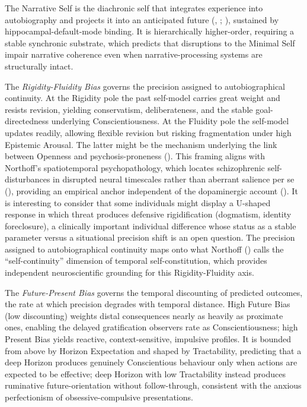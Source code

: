 \documentclass[
  jou,
  floatsintext,
  longtable,
  nolmodern,
  notxfonts,
  notimes,
  12pt,
  colorlinks=true,linkcolor=blue,citecolor=blue,urlcolor=blue]{apa7}
\begin{document}
The Narrative Self is the diachronic self that integrates experience
into autobiography and projects it into an anticipated future
(,
;
), sustained by
hippocampal-default-mode binding. It is hierarchically higher-order,
requiring a stable synchronic substrate, which predicts that disruptions
to the Minimal Self impair narrative coherence even when
narrative-processing systems are structurally intact.

The \emph{Rigidity-Fluidity Bias} governs the precision assigned to
autobiographical continuity. At the Rigidity pole the past self-model
carries great weight and resists revision, yielding conservatism,
deliberateness, and the stable goal-directedness underlying
Conscientiousness. At the Fluidity pole the self-model updates readily,
allowing flexible revision but risking fragmentation under high
Epistemic Arousal. The latter might be the mechanism underlying the link
between Openness and psychosis-proneness
(). This framing aligns
with Northoff's spatiotemporal psychopathology, which locates
schizophrenic self-disturbances in disrupted neural timescales rather
than aberrant salience per se
(), providing an
empirical anchor independent of the dopaminergic account
(). It is interesting to
consider that some individuals might display a U-shaped response in
which threat produces defensive rigidification (dogmatism, identity
foreclosure), a clinically important individual difference whose status
as a stable parameter versus a situational precision shift is an open
question. The precision assigned to autobiographical continuity maps
onto what Northoff () calls the
``self-continuity'' dimension of temporal self-constitution, which
provides independent neuroscientific grounding for this
Rigidity-Fluidity axis.

The \emph{Future-Present Bias} governs the temporal discounting of
predicted outcomes, the rate at which precision degrades with temporal
distance. High Future Bias (low discounting) weights distal consequences
nearly as heavily as proximate ones, enabling the delayed gratification
observers rate as Conscientiousness; high Present Bias yields reactive,
context-sensitive, impulsive profiles. It is bounded from above by
Horizon Expectation and shaped by Tractability, predicting that a deep
Horizon produces genuinely Conscientious behaviour only when actions are
expected to be effective; deep Horizon with low Tractability instead
produces ruminative future-orientation without follow-through,
consistent with the anxious perfectionism of obsessive-compulsive
presentations.
\end{document}
